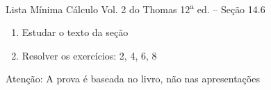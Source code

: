 \begin{frame}{Lista Mínima}
  Cálculo Vol. 2 do Thomas 12\textsuperscript{a} ed. -- Seção 14.6
  \begin{enumerate}
    \item Estudar o texto da seção
    \item Resolver os exercícios: 2, 4, 6, 8
  \end{enumerate}

  \vfill
  Atenção: A prova é baseada no livro, não nas apresentações
\end{frame}


